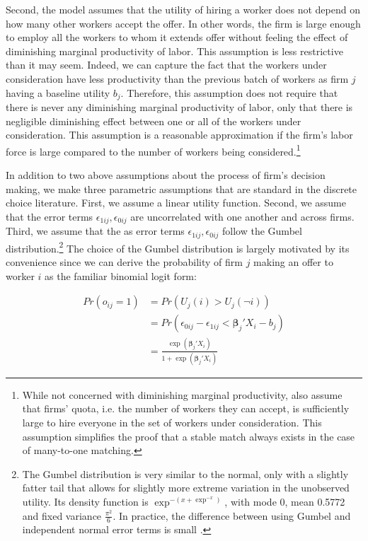 Second, the model assumes that the utility of hiring a worker does not depend on
how many other workers accept the offer. In other words, the
firm is large enough to employ all the workers to whom it extends offer without feeling
the effect of diminishing marginal productivity of labor. This assumption is less
restrictive than it may seem. Indeed, we can capture the fact that the workers under
consideration have less productivity than the previous batch of workers as firm
$j$ having a baseline utility $b_j$. Therefore, this assumption does not require
that there is never any diminishing marginal productivity of labor, only that
there is negligible diminishing effect between one or all of the workers
under consideration. This assumption is a reasonable approximation if the firm's labor force is
large compared to the number of workers being considered.\footnote{While not
  concerned with diminishing marginal productivity, \citet{Roth1992} also
  assume that firms' quota, i.e. the number of workers they can accept, is
  sufficiently large to hire everyone in the set of workers under consideration. This assumption
  simplifies the proof that a stable match always exists in the case of
  many-to-one matching.}

In addition to two above assumptions about the process of firm's decision
making, we make three parametric assumptions that are standard in the discrete choice literature.
First, we assume a linear utility function. Second, we assume that the error
terms $\epsilon_{1ij}, \epsilon_{0ij}$ are uncorrelated with one another and
across firms. Third, we assume that the as error terms $\epsilon_{1ij}, \epsilon_{0ij}$ follow
the Gumbel distribution.\footnote{The Gumbel distribution is very similar to the
  normal, only with a slightly fatter tail that allows for slightly more extreme variation in the unobserved
utility. Its density function is $\exp^{-(x + \exp^{-x})}$, with mode 0, mean 0.5772 and fixed
variance $\frac{\pi^2}{6}$. In practice, the difference between using Gumbel and independent normal
error terms is small \citep{Train2009}.} The choice of the Gumbel distribution is largely motivated by its
convenience since we can derive the probability of firm $j$ making an offer to worker $i$ as the familiar binomial logit form:

\begin{align}
Pr(o_{ij} = 1) &= Pr(U_j(i) > U_j(\neg i)) \\
&= Pr(\epsilon_{0ij} - \epsilon_{1ij} <  \bm{\beta}_j ' X_i - b_j) \\
&= \frac{\exp({\bm{\beta}_j'X_i})}{1 + \exp({\bm{\beta}_j'X_i})} \label{eq:prob_offer_ij}
\end{align}

